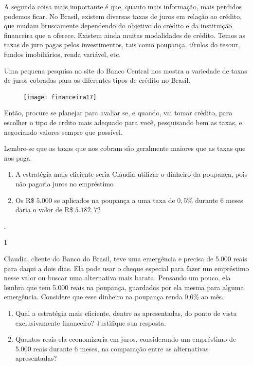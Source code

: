 A segunda coisa mais importante é que, quanto mais informação, mais perdidos podemos ficar. No Brasil, existem diversas taxas de juros em relação ao crédito, que mudam bruscamente dependendo do objetivo do crédito e da instituição financeira que a oferece. Existem ainda muitas modalidades de crédito. Temos as taxas de juro pagas pelos investimentos, tais como poupança, títulos do tesour, fundos imobiliários, renda variável, etc.

Uma pequena pesquisa no site do Banco Central nos mostra a variedade de taxas de juros cobradas para os diferentes tipos de crédito no Brasil.

\begin{figure}[H]
\centering

\texttt{[image: financeira17]}
\end{figure}

Então, procure se planejar para avaliar se, e quando, vai tomar crédito, para escolher o tipo de crdito mais adequado para você, pesquisando bem as taxas, e negociando valores sempre que possível.

Lembre-se que as taxas que nos cobram são geralmente maiores que as taxas que nos paga.



\begin{resposta}{}
{
  \begin{enumerate}
    \item A estratégia mais eficiente seria Cláudia utilizar o dinheiro da poupança, pois não pagaria juros no empréstimo
    \item Os R\$ $5.000$ se aplicados na poupança a uma taxa de $0{,}5$\% durante 6 meses daria o valor de R\$ $5.182{,}72$
  \end{enumerate}.
}{1}
\end{resposta}
\begin{task}{}

Claudia, cliente do Banco do Brasil, teve uma emergência e precisa de 5.000 reais para daqui a dois dias. Ela pode usar o cheque especial para fazer um empréstimo nesse valor ou buscar uma alternativa mais barata. Pensando um pouco, ela lembra que tem 5.000 reais na poupança, guardados por ela mesma para alguma emergência. Considere que esse dinheiro na poupança renda 0,6\% ao mês. 

\begin{enumerate}
\item Qual a estratégia mais eficiente, dentre as apresentadas, do ponto de vista exclusivamente financeiro? Justifique sua resposta. 
\item Quantos reais ela economizaria em juros, considerando um empréstimo de 5.000 reais durante 6 meses, na comparação entre as alternativas apresentadas?
\end{enumerate}
\end{task}

